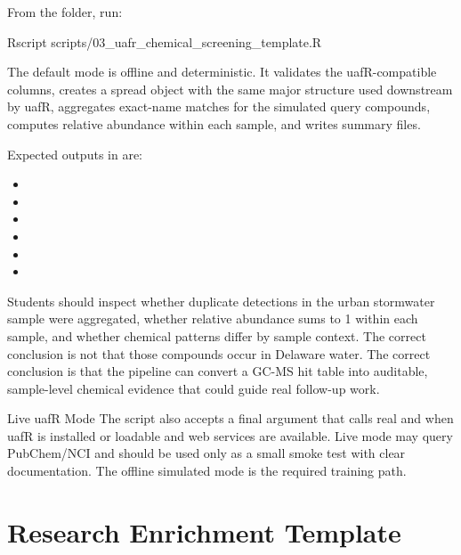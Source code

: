 From the  folder, run:

\begin{rcode}
Rscript scripts/03_uafr_chemical_screening_template.R
\end{rcode}

The default mode is offline and deterministic. It validates the uafR-compatible columns, creates a spread object with the same major structure used downstream by uafR, aggregates exact-name matches for the simulated query compounds, computes relative abundance within each sample, and writes summary files.

Expected outputs in  are:
\begin{itemize}
  \item {}
  \item {}
  \item {}
  \item {}
  \item {}
  \item {}
\end{itemize}

Students should inspect whether duplicate  detections in the urban stormwater sample were aggregated, whether relative abundance sums to 1 within each sample, and whether chemical patterns differ by sample context. The correct conclusion is not that those compounds occur in Delaware water. The correct conclusion is that the pipeline can convert a GC-MS hit table into auditable, sample-level chemical evidence that could guide real follow-up work.

\begin{cautionbox}{Live uafR Mode}
The script also accepts a final  argument that calls real  and  when uafR is installed or loadable and web services are available. Live mode may query PubChem/NCI and should be used only as a small smoke test with clear documentation. The offline simulated mode is the required training path.
\end{cautionbox}

\section{Research Enrichment Template}

